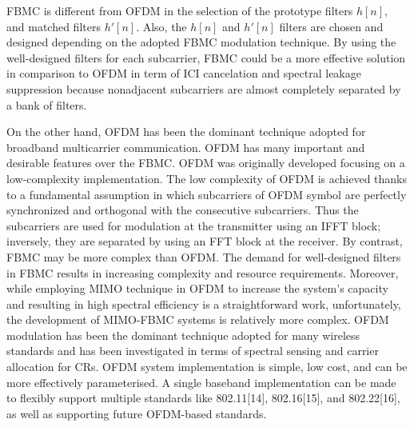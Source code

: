 \documentclass{article}
\begin{document}
FBMC is different from OFDM in the selection of the prototype filters $h[n]$, and matched filters $h'[n]$. Also, the $h[n]$ and $h'[n]$ filters are chosen and designed depending on the adopted FBMC modulation technique.
By using the well-designed filters for each subcarrier, FBMC could be a more effective solution in comparison to OFDM in term of ICI cancelation and spectral leakage suppression because nonadjacent subcarriers are almost completely separated by a bank of filters.

On the other hand, OFDM has been the dominant technique adopted for broadband multicarrier communication.
OFDM has many important and desirable features over the FBMC. OFDM was originally developed focusing on a low-complexity implementation. The low complexity of OFDM is achieved thanks to a fundamental assumption in which subcarriers of OFDM symbol are perfectly synchronized and orthogonal with the consecutive subcarriers. Thus the subcarriers are used for modulation at the transmitter using an IFFT block; inversely, they are separated by using an FFT block at the receiver. By contrast, FBMC may be more complex than OFDM. The demand for well-designed filters in FBMC results in increasing complexity and resource requirements. Moreover, while employing MIMO technique in OFDM to increase the system's capacity and resulting in high spectral efficiency is a straightforward work, unfortunately, the development of MIMO-FBMC systems is relatively more complex.
OFDM modulation has been the dominant technique adopted for many wireless standards and has been investigated in terms of spectral sensing and carrier allocation for CRs.
OFDM system implementation is simple, low cost, and can be more effectively parameterised.
A single baseband implementation can be made to flexibly support multiple standards like 802.11[14], 802.16[15], and 802.22[16], as well as supporting future OFDM-based standards.
\end{document}
